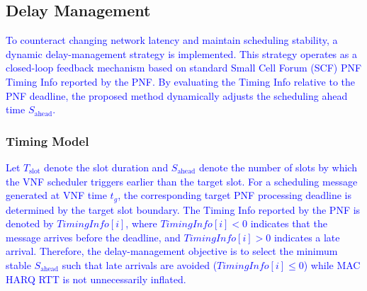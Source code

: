 \documentclass[10pt, conference, letterpaper]{IEEEtran}
\begin{document}
\subsection{Delay Management}
\label{subsec:delay_management}

\textcolor{blue}{To counteract changing network latency and maintain scheduling stability, a dynamic delay-management strategy is implemented. This strategy operates as a closed-loop feedback mechanism based on standard Small Cell Forum (SCF) PNF Timing Info reported by the PNF. By evaluating the Timing Info relative to the PNF deadline, the proposed method dynamically adjusts the scheduling ahead time $S_{\mathrm{ahead}}$.}

\subsubsection{Timing Model}
\textcolor{blue}{Let $T_{\mathrm{slot}}$ denote the slot duration and $S_{\mathrm{ahead}}$ denote the number of slots by which the VNF scheduler triggers earlier than the target slot. For a scheduling message generated at VNF time $t_g$, the corresponding target PNF processing deadline is determined by the target slot boundary. The Timing Info reported by the PNF is denoted by $\mathit{TimingInfo}[i]$, where $\mathit{TimingInfo}[i] < 0$ indicates that the message arrives before the deadline, and $\mathit{TimingInfo}[i] > 0$ indicates a late arrival. Therefore, the delay-management objective is to select the minimum stable $S_{\mathrm{ahead}}$ such that late arrivals are avoided ($\mathit{TimingInfo}[i] \le 0$) while MAC HARQ RTT is not unnecessarily inflated.}
\end{document}
